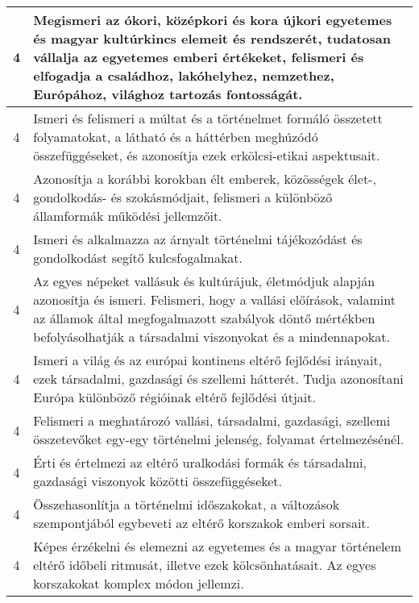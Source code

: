 \begin{longtable}{c | p{} }
                                
                                          4 &  Megismeri az ókori, középkori és kora újkori egyetemes és magyar kultúrkincs elemeit és rendszerét, tudatosan vállalja az egyetemes emberi értékeket, felismeri és elfogadja a családhoz, lakóhelyhez, nemzethez, Európához, világhoz tartozás fontosságát. \\ \hline
                                          4 &  Ismeri és felismeri a múltat és a történelmet formáló összetett folyamatokat, a látható és a háttérben meghúzódó összefüggéseket, és azonosítja ezek erkölcsi-etikai aspektusait. \\ \hline
                                          4 &  Azonosítja a korábbi korokban élt emberek, közösségek élet-, gondolkodás- és szokásmódjait, felismeri a különböző államformák működési jellemzőit. \\ \hline
                                          4 &  Ismeri és alkalmazza az árnyalt történelmi tájékozódást és gondolkodást segítő kulcsfogalmakat. \\ \hline
                                          4 &  Az egyes népeket vallásuk és kultúrájuk, életmódjuk alapján azonosítja és ismeri. Felismeri, hogy a vallási előírások, valamint az államok által megfogalmazott szabályok döntő mértékben befolyásolhatják a társadalmi viszonyokat és a mindennapokat. \\ \hline
                                          4 &  Ismeri a világ és az európai kontinens eltérő fejlődési irányait, ezek társadalmi, gazdasági és szellemi hátterét. Tudja azonosítani Európa különböző régióinak eltérő fejlődési útjait. \\ \hline
                                          4 &  Felismeri a meghatározó vallási, társadalmi, gazdasági, szellemi összetevőket egy-egy történelmi jelenség, folyamat értelmezésénél. \\ \hline
                                          4 &  Érti és értelmezi az eltérő uralkodási formák és társadalmi, gazdasági viszonyok közötti összefüggéseket. \\ \hline
                                          4 &  Összehasonlítja a történelmi időszakokat, a változások szempontjából egybeveti az eltérő korszakok emberi sorsait. \\ \hline
                                          4 &  Képes érzékelni és elemezni az egyetemes és a magyar történelem eltérő időbeli ritmusát, illetve ezek kölcsönhatásait. Az egyes korszakokat komplex módon jellemzi. \\ \hline
                                      
                        \end{longtable}
            \clearpage

